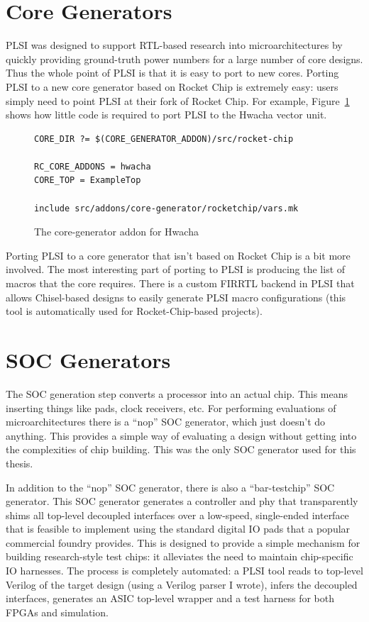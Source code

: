 \documentclass{article}
\begin{document}
\section{Core Generators}

PLSI was designed to support RTL-based research into microarchitectures by
quickly providing ground-truth power numbers for a large number of core
designs.  Thus the whole point of PLSI is that it is easy to port to new cores.
Porting PLSI to a new core generator based on Rocket Chip is extremely easy:
users simply need to point PLSI at their fork of Rocket Chip.  For example,
Figure~\ref{impl:hwacha-coregen} shows how little code is required to port PLSI
to the Hwacha vector unit.

\begin{figure}
\begin{verbatim}
CORE_DIR ?= $(CORE_GENERATOR_ADDON)/src/rocket-chip

RC_CORE_ADDONS = hwacha
CORE_TOP = ExampleTop

include src/addons/core-generator/rocketchip/vars.mk
\end{verbatim}
\caption{The core-generator addon for Hwacha}
\label{impl:hwacha-coregen}
\end{figure}

Porting PLSI to a core generator that isn't based on Rocket Chip is a bit more
involved.  The most interesting part of porting to PLSI is producing the list of
macros that the core requires.  There is a custom FIRRTL backend in PLSI that
allows Chisel-based designs to easily generate PLSI macro configurations (this
tool is automatically used for Rocket-Chip-based projects).
\section{SOC Generators}

The SOC generation step converts a processor into an actual chip.  This means
inserting things like pads, clock receivers, etc.  For performing evaluations
of microarchitectures there is a ``nop'' SOC generator, which just doesn't do
anything.  This provides a simple way of evaluating a design without getting
into the complexities of chip building.  This was the only SOC generator used
for this thesis.

In addition to the ``nop'' SOC generator, there is also a ``bar-testchip'' SOC
generator.  This SOC generator generates a controller and phy that
transparently shims all top-level decoupled interfaces over a low-speed,
single-ended interface that is feasible to implement using the standard digital
IO pads that a popular commercial foundry provides.  This is designed to
provide a simple mechanism for building research-style test chips: it
alleviates the need to maintain chip-specific IO harnesses.  The process is
completely automated: a PLSI tool reads to top-level Verilog of the target
design (using a Verilog parser I wrote), infers the decoupled interfaces,
generates an ASIC top-level wrapper and a test harness for both FPGAs and
simulation.
\end{document}
